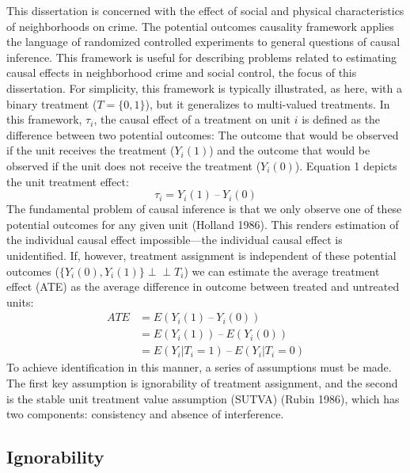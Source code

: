 \documentclass [11pt, proquest] {uwthesis}[2015/03/03]
\begin{document}
This dissertation is concerned with the effect of social and physical characteristics of neighborhoods on crime. The potential outcomes causality framework applies the language of randomized controlled experiments to general questions of causal inference. This framework is useful for describing problems related to estimating causal effects in neighborhood crime and social control, the focus of this dissertation. For simplicity, this framework is typically illustrated, as here, with a binary treatment (\(T = \{0,1\}\)), but it generalizes to multi-valued treatments. In this framework, \(\tau_i\), the causal effect of a treatment on unit \(i\) is defined as the difference between two potential outcomes: The outcome that would be observed if the unit receives the treatment (\(Y_i(1)\)) and the outcome that would be observed if the unit does not receive the treatment (\(Y_i(0)\)). Equation 1 depicts the unit treatment effect:
\begin{equation}
\tau_i  = Y_i(1) \:–\: Y_i(0)
\label{eq:unittreateffect}
\end{equation}
The fundamental problem of causal inference is that we only observe one of these potential outcomes for any given unit (Holland 1986). This renders estimation of the individual causal effect impossible---the individual causal effect is unidentified. If, however, treatment assignment is independent of these potential outcomes (\(\{Y_i(0), Y_i(1)\} \perp\!\!\!\perp T_i\)) we can estimate the average treatment effect (ATE) as the average difference in outcome between treated and untreated units:
\begin{equation}
\begin{split}
ATE & = E(Y_i(1) \:–\: Y_i(0))\\
& = E(Y_i(1)) \:–\: E(Y_i(0))\\
& = E(Y_i|T_i=1) \:–\: E(Y_i|T_i=0)
\end{split}
\label{eq:ate}
\end{equation}
To achieve identification in this manner, a series of assumptions must be made. The first key assumption is ignorability of treatment assignment, and the second is the stable unit treatment value assumption (SUTVA) (Rubin 1986), which has two components: consistency and absence of interference.

\hypertarget{ignorability}{%
\subsection{Ignorability}\label{ignorability}}
\end{document}
